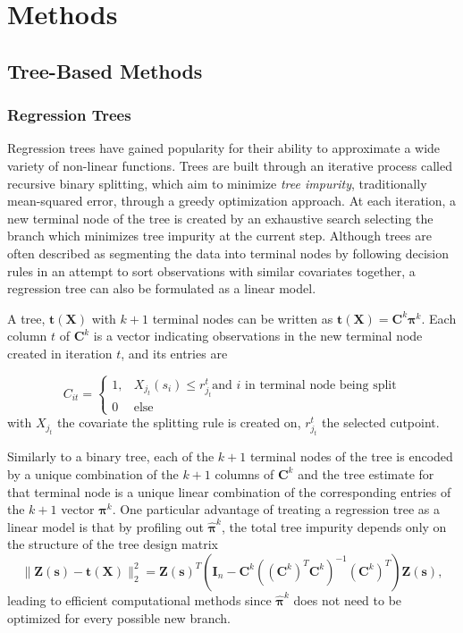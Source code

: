 \documentclass[12pt]{article}
\newcommand{\covs}{\mathbf{X}}
\newcommand{\obs}{\mathbf{Z}(\mathbf{s})}
\newcommand{\eye}{\mathbf{I} }
\newcommand{\tree} { \mathbf{t} (\covs) }
\newcommand{\tdsgn}{\mathbf{C}^k}
\newcommand{\tcntrst}{\boldsymbol{\pi}^k}
\newcommand{\esttcntrs}{\boldsymbol{\hat \pi}^k}
\begin{document}
\section{Methods}
\label{sec:meth}

\subsection{Tree-Based Methods}

\subsubsection{Regression Trees}
\label{treelinmod}

Regression trees have gained popularity for their ability to approximate a wide variety of non-linear functions. Trees are built through an iterative process called recursive binary splitting, which aim to minimize \textit{tree impurity}, traditionally mean-squared error, through a greedy optimization approach. At each iteration, a new terminal node of the tree is created by an exhaustive search selecting the branch which minimizes tree impurity at the current step. Although trees are often described as segmenting the data into terminal nodes by following decision rules in an attempt to sort observations with similar covariates together, a regression tree can also be formulated as a linear model. 
 
A tree, $\tree$ with $k+1$ terminal nodes can be written as $\mathbf{ \tree}= \tdsgn \tcntrst $.  Each column $t$ of $\tdsgn$ is a vector indicating observations in the new terminal node created in iteration $t$, and its entries are

$$  C_{i t} = \begin{cases}
1, &  X_{j_t}(s_i) \leq r^t_{j_t} \text{and } i \text{ in terminal node being split}   \\
0 & \text{else} 
\end{cases} $$
with $X_{j_t}$ the covariate the splitting rule is created on, $r^t_{j_t}$ the selected cutpoint.

Similarly to a binary tree, each of the $k+1$ terminal nodes of the tree is encoded by a unique combination of the $k+1$ columns of $\tdsgn$ and the tree estimate for that terminal node is a unique linear combination of the corresponding entries of the $k+1$ vector $\tcntrst$.  
One particular advantage of treating a regression tree as a linear model is that by profiling out $\esttcntrs$, the total tree impurity depends only on the structure of the tree design matrix 
$$\|\obs - \mathbf{\tree} \|_2^2 = \obs^T \left(\eye_n - \tdsgn \left( (\tdsgn)^T \tdsgn \right)^{-1} (\tdsgn)^T \right) \obs,$$
leading to efficient computational methods since $\esttcntrs$ does not need to be optimized for every possible new branch.
\end{document}
